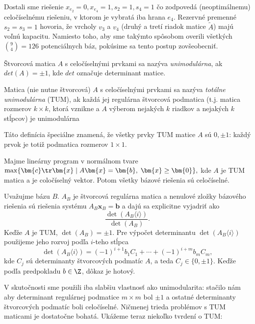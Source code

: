 Dostali sme riešenie
  $x_{e_2}=0, x_{e_4}=1, s_2=1, s_4=1$
čo zodpovedá (neoptimálnemu) celočíselnému riešeniu, v ktorom je vybratá iba hrana $e_4$.
Rezervné premenné $s_2=s_3=1$ hovoria, že vrcholy $v_3$ a $v_4$ (druhý a tretí riadok matice $\tilde{A}$) majú voľnú kapacitu.
Namiesto toho, aby sme takýmto spôsobom overili všetkých ${9\choose4}=126$ potenciálnych báz, pokúsime sa tento postup zovšeobecniť.

\begin{framed}
  \begin{dfn}
    Štvorcová matica $A$ s celočíselnými prvkami sa nazýva {\em unimodulárna}, ak $det(A)=\pm1$, kde $det$ označuje determinant matice.
    
    Matica (nie nutne štvorcová) $A$ s celočíselnými prvkami sa nazýva {\em totálne unimodulárna} (TUM), ak každá jej regulárna 
    štvorcová podmatica (t.j. matica rozmerov $k\times k$, ktorá vznikne a $A$ výberom nejakých $k$ riadkov a nejakých $k$ stĺpcov)
    je unimodulárna
  \end{dfn}
\end{framed}

\noindent
Táto definícia špeciálne znamená, že všetky prvky TUM matice $A$ sú $0,\pm1$: každý prvok je totiž podmatica rozmerov $1\times1$.

\begin{veta}
  \label{thm:tumInteger}
  Majme lineárny program v normálnom tvare 
  $\max\{\bm{c}\tr\bm{x}\mid A\bm{x}=\bm{b},\;\bm{x}\ge\bm{0}\},$
  kde $A$ je TUM matica a  je coločíselný vektor. 
  Potom všetky bázové riešenia sú celočíselné.
\end{veta}
\begin{dokaz}
  Uvažujme bázu $B$. $A_B$ je štvorcová regulárna matica a nenulové zložky bázového riešenia sú riešenia systému
  $A_B\bm{x}_B=\bm{b}$ a dajú sa explicitne vyjadriť ako
  $$\frac{\det\left(A_B\langle i\rangle\right)}{\det(A_B)}.$$
  Keďže $A$ je TUM, $\det(A_B)=\pm1$. Pre výpočet determinantu $\det\left(A_B\langle i\rangle\right)$ použijeme jeho rozvoj
  podľa $i$-teho stĺpca
  $$\det\left(A_B\langle i\rangle\right)=(-1)^{i+1}b_1C_1+\cdots+(-1)^{i+m}b_mC_m,$$
  kde $C_j$ sú determinanty štvorcových podmatíc $A$, a teda $C_j\in\{0,\pm1\}$. Keďže podľa predpokladu $b\in\Z$, dôkaz je hotový.
\end{dokaz}

\noindent
V skutočnosti sme použili iba slabšiu vlastnosť ako unimodularita: stačilo nám aby determinant regulárnej podmatice $m\times m$ bol $\pm1$ a
ostatné determinanty štvorcových podmatíc boli celočíselné. Ničmenej trieda problémov s TUM maticami je dostatočne bohatá. Ukážeme teraz niekoľko
tvrdení o TUM:

